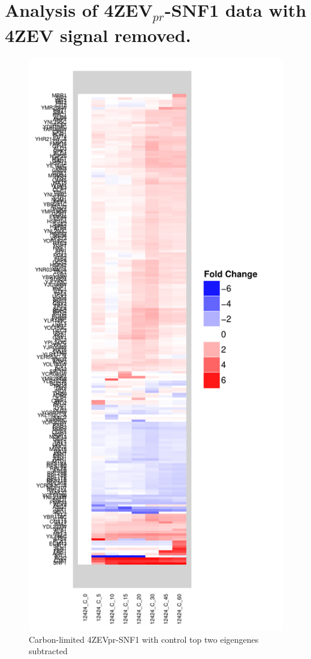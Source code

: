 \documentclass[letter]{article}\usepackage{graphicx, color}
\makeatletter
\def\maxwidth{ %
  \ifdim\Gin@nat@width>\linewidth
    \linewidth
  \else
    \Gin@nat@width
  \fi
}
\newenvironment{knitrout}{}{} %
\makeatother
\begin{document}
\section*{Analysis of 4ZEV$_{pr}$-SNF1 data with 4ZEV signal removed.}
\begin{figure}
\centering
\begin{knitrout}
\color{fgcolor}\includegraphics[width=\maxwidth]{figure/p8} 
\end{knitrout}

\caption{Carbon-limited 4ZEVpr-SNF1 with control top two eigengenes subtracted}
\end{figure}
\end{document}
